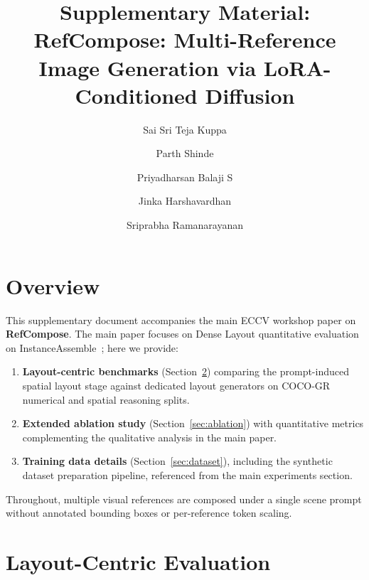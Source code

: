 \documentclass[runningheads]{llncs}
\begin{document}
\title{Supplementary Material:\\RefCompose: Multi-Reference Image Generation via LoRA-Conditioned Diffusion}


\author{Sai Sri Teja Kuppa \and
Parth Shinde \and
Priyadharsan Balaji S \and
Jinka Harshavardhan \and
Sriprabha Ramanarayanan}



\maketitle

\section{Overview}
\label{sec:overview}

This supplementary document accompanies the main ECCV workshop paper on \textbf{RefCompose}.
The main paper focuses on Dense Layout quantitative evaluation on InstanceAssemble~\cite{xiang2025instanceassemble}; here we provide:
\begin{enumerate}
  \item \textbf{Layout-centric benchmarks} (Section~\ref{sec:layout_eval}) comparing the prompt-induced spatial layout stage against dedicated layout generators on COCO-GR~\cite{feng2023layoutgpt} numerical and spatial reasoning splits.
  \item \textbf{Extended ablation study} (Section~\ref{sec:ablation}) with quantitative metrics complementing the qualitative analysis in the main paper.
  \item \textbf{Training data details} (Section~\ref{sec:dataset}), including the synthetic dataset preparation pipeline, referenced from the main experiments section.
\end{enumerate}
Throughout, multiple visual references are composed under a single scene prompt without annotated bounding boxes or per-reference token scaling.

\section{Layout-Centric Evaluation}
\label{sec:layout_eval}
\end{document}
